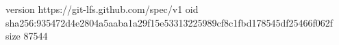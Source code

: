 version https://git-lfs.github.com/spec/v1
oid sha256:935472d4e2804a5aaba1a29f15e53313225989cf8c1fbd178545df25466f062f
size 87544
